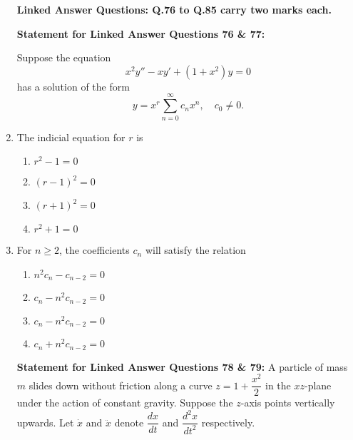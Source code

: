 \documentclass[journal]{IEEEtran}
\numberwithin{equation}{enumi}
\numberwithin{figure}{enumi}
\begin{document}
\begin{enumerate}
\bigskip
\begin{center}
 \textbf{Linked Answer Questions: Q.76 to Q.85 carry two marks each.}   
\end{center}
\vspace{1em}

\textbf{Statement for Linked Answer Questions 76 \& 77:}  

Suppose the equation  
\[
x^2 y'' - x y' + (1 + x^2) y = 0
\]
has a solution of the form  
\[
y = x^r \sum_{n=0}^{\infty} c_n x^n,\quad c_0 \neq 0.
\]

\item The indicial equation for $r$ is
\hfill{}
\begin{multicols}{2}
    \begin{enumerate}
        \item  $r^2 - 1 = 0$
        \item $(r - 1)^2 = 0$
        \item $(r + 1)^2 = 0$ 
        \item $r^2 + 1 = 0$
    \end{enumerate}
    \end{multicols}



\newpage
\item For $n \geq 2$, the coefficients $c_n$ will satisfy the relation
\hfill{}
\begin{multicols}{2}
    \begin{enumerate}
        \item  $n^2 c_n - c_{n-2} = 0$
        \item $c_n - n^2 c_{n-2} = 0$
        \item $c_n - n^2 c_{n-2} = 0$
        \item $c_n + n^2 c_{n-2} = 0$
    \end{enumerate}
    \end{multicols}

 

\textbf{Statement for Linked Answer Questions 78 \& 79:} 
\newline \vspace{1em}
A particle of mass $m$ slides down without friction along a curve $z = 1 + \dfrac{x^2}{2}$ in the $xz$-plane under the action of constant gravity. Suppose the $z$-axis points vertically upwards. Let $\dot{x}$ and $\ddot{x}$ denote $\dfrac{dx}{dt}$ and $\dfrac{d^2x}{dt^2}$ respectively.


\end{enumerate}
\end{document}
